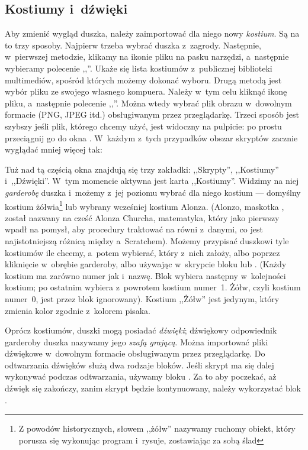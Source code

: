\documentclass[a4paper]{report}
\begin{document}
\subsection{Kostiumy i~dźwięki}

Aby zmienić wygląd duszka, należy zaimportować dla niego nowy \emph{kostium}. Są na to trzy sposoby. Najpierw trzeba wybrać duszka z~zagrody. Następnie, w~pierwszej metodzie, klikamy na ikonie pliku  na pasku narzędzi, a~następnie wybieramy polecenie ,,''. Ukaże się lista kostiumów z~publicznej biblioteki multimediów, spośród których możemy dokonać wyboru. Drugą metodą jest wybór pliku ze swojego własnego kompuera. Należy w~tym celu kliknąć ikonę pliku, a~następnie polecenie ,,''. Można wtedy wybrać plik obrazu w~dowolnym formacie (PNG, JPEG itd.) obsługiwanym przez przeglądarkę. Trzeci sposób jest szybszy jeśli plik, którego chcemy użyć, jest widoczny na pulpicie: po prostu przeciągnij go do okna . W~każdym z~tych przypadków obszar skryptów zacznie wyglądać mniej więcej tak:\nopagebreak


Tuż nad tą częścią okna znajdują się trzy zakładki: ,,Skrypty'', ,,Kostiumy'' i~,,Dźwię\-ki''. W~tym momencie aktywna jest karta ,,Kostiumy''. Widzimy na niej \emph{garderobę} duszka i~możemy z~jej poziomu wybrać dla niego kostium --- domyślny kostium żółwia\footnote{Z powodów historycznych, słowem ,,żółw'' nazywamy ruchomy obiekt, który porusza się wykonując program i~rysuje, zostawiając za sobą ślad} lub wybrany wcześniej kostium Alonza. (Alonzo, maskotka , został nazwany na cześć Alonza Churcha, matematyka, który jako pierwszy wpadł na pomysł, aby procedury traktować na równi z~danymi, co jest najistotniejszą różnicą między  a~Scratchem). Możemy przypisać duszkowi tyle kostiumów ile chcemy, a~potem wybierać, który z~nich założy, albo poprzez kliknięcie w~obrębie garderoby, albo używając w~skrypcie bloku  lub . (Każdy kostium ma zarówno numer jak i~nazwę. Blok  wybiera następny w~kolejności kostium; po ostatnim wybiera z~powrotem kostium numer~1. Żółw, czyli kostium numer~0, jest przez blok  ignorowany). Kostium ,,Żółw'' jest jedynym, który zmienia kolor zgodnie z~kolorem pisaka.

Oprócz kostiumów, duszki mogą posiadać \emph{dźwięki}; dźwiękowy odpowiednik garderoby duszka nazywamy jego \emph{szafą grającą}. Można importować pliki dźwiękowe w~dowolnym formacie obsługiwanym przez przeglądarkę. Do odtwarzania dźwięków służą dwa rodzaje bloków. Jeśli skrypt ma się dalej wykonywać podczas odtwarzania, używamy bloku . Za to aby poczekać, aż dźwięk się zakończy, zanim skrypt będzie kontynuowany, należy wykorzystać blok .
\end{document}
